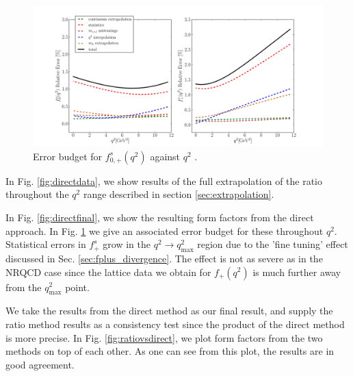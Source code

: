 \begin{figure}[htb!]
  \hspace{-85pt}
  \includegraphics[width=1.4\textwidth]{images/BsDs/direct/errorbudget.pdf}
  \caption{ Error budget for $f_{0,+}^s(q^2)$ against $q^2$ \label{fig:directerrorbudget}.}
\end{figure}

In Fig. \ref{fig:directdata}, we show results of the full extrapolation of the ratio throughout the $q^2$ range described in section \ref{sec:extrapolation}.

In Fig. \ref{fig:directfinal}, we show the resulting form factors from the direct approach. In Fig. \ref{fig:directerrorbudget} we give an associated error budget for these throughout $q^2$. Statistical errors in $f^s_+$ grow in the $q^2\to q^2_{\text{max}}$ region due to the 'fine tuning' effect discussed in Sec. \ref{sec:fplus_divergence}. The effect is not as severe as in the NRQCD case since the lattice data we obtain for $f_+(q^2)$ is much further away from the $q^2_{\text{max}}$ point.

We take the results from the direct method as our final result, and supply the ratio method results as a consistency test since the product of the direct method is more precise. In Fig. \ref{fig:ratiovsdirect}, we plot form factors from the two methods on top of each other. As one can see from this plot, the results are in good agreement.

